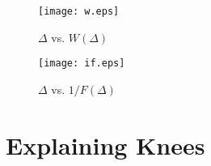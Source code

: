 \documentclass[12pt,letterpaper]{article}
\begin{document}
\begin{figure}
\begin{center}
\texttt{[image: w.eps]}
\caption{$\Delta$ vs. $W(\Delta)$}
\end{center}
\end{figure}

\begin{figure}
\begin{center}
\texttt{[image: if.eps]}
\caption{$\Delta$ vs. $1/F(\Delta)$}
\end{center}
\end{figure}

\section{Explaining Knees}

\end{document}

